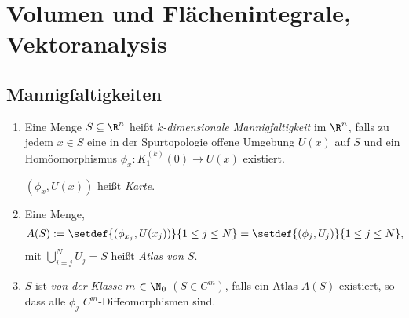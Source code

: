\section{Volumen und Flächenintegrale, Vektoranalysis}

\subsection{Mannigfaltigkeiten}


\begin{defn}
\label{defn:4.1}
\begin{enumerate}[label=\arabic{*}.)]
  \item Eine Menge $S\subseteq\R^n$ heißt \emph{$k$-dimensionale Mannigfaltigkeit} im
$\R^n$, falls zu jedem $x\in S$ eine in der Spurtopologie offene Umgebung $U(x)$ auf $S$
und ein Homöomorphismus $\phi_x: K_1^{(k)}(0)\to U(x)$ existiert.

$(\phi_x, U(x))$ heißt \emph{Karte}.
\item Eine Menge,
\begin{align*}
A(S) := \setdef{(\phi_{x_j},U(x_j))}{1\le j\le N}
 =\setdef{(\phi_j, U_j)}{1\le j\le N},
\end{align*}
mit $\bigcup_{i=j}^N U_j = S$
heißt \emph{Atlas von $S$}.
\item $S$ ist \emph{von der Klasse $m$} $\in\N_0$ $(S\in C^m)$, falls ein Atlas
$A(S)$ existiert, so dass alle $\phi_j$ $C^m$-Diffeomorphismen sind.\fishhere
\end{enumerate}
\end{defn}

